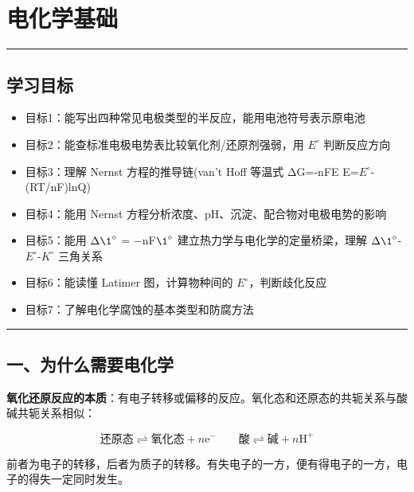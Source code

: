 \section{电化学基础}\label{ux7535ux5316ux5b66ux57faux7840}

\begin{center}\rule{0.5\linewidth}{0.5pt}\end{center}

\subsection{学习目标}\label{ux5b66ux4e60ux76eeux6807}

\begin{itemize}
\tightlist
\item
  目标1：能写出四种常见电极类型的半反应，能用电池符号表示原电池
\item
  目标2：能查标准电极电势表比较氧化剂/还原剂强弱，用 \(E^{\circ}\) 判断反应方向
\item
  目标3：理解 Nernst 方程的推导链(van't Hoff 等温式 \箭 ΔG=-nFE \箭 E=\(E^{\circ}\)-(RT/nF)lnQ)
\item
  目标4：能用 Nernst 方程分析浓度、pH、沉淀、配合物对电极电势的影响
\item
  目标5：能用 \(\Delta \1^{\circ}\) = −nF\(\1^{\circ}\) 建立热力学与电化学的定量桥梁，理解 \(\Delta \1^{\circ}\)-\(E^{\circ}\)-\(K^{\circ}\) 三角关系
\item
  目标6：能读懂 Latimer 图，计算物种间的 \(E^{\circ}\)，判断歧化反应
\item
  目标7：了解电化学腐蚀的基本类型和防腐方法
\end{itemize}

\begin{center}\rule{0.5\linewidth}{0.5pt}\end{center}

\subsection{一、为什么需要电化学}\label{ux4e00ux4e3aux4ec0ux4e48ux9700ux8981ux7535ux5316ux5b66}

\textbf{氧化还原反应的本质}：有电子转移或偏移的反应。氧化态和还原态的共轭关系与酸碱共轭关系相似：

\[
\text{还原态} \rightleftharpoons \text{氧化态} + n\mathrm{e}^- \qquad \text{酸} \rightleftharpoons \text{碱} + n\mathrm{H}^+
\]

前者为电子的转移，后者为质子的转移。有失电子的一方，便有得电子的一方，电子的得失一定同时发生。

